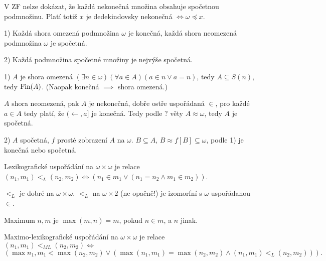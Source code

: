 \documentclass[12pt]{article}                   %
\begin{document}
    \begin{poznamka}
        V ZF nelze dokázat, že každá nekonečná množina obsahuje spočetnou podmnožinu. Platí totiž $x$ je dedekindovsky nekonečná $\Leftrightarrow \omega \preceq x$.
    \end{poznamka}

    \begin{veta}
        1) Každá shora omezená podmnožina $\omega$ je konečná, každá shora neomezená podmnožina $\omega$ je spočetná.

        2) Každá podmnožina spočetné množiny je nejvýše spočetná.

        \begin{dukazin}
            1) $A$ je shora omezená $(\exists n \in \omega)(\forall a \in A)(a \in n \lor a = n)$, tedy $A \subseteq S(n)$, tedy $\operatorname{Fin}(A)$. (Naopak konečná $\implies$ shora omezená.)

            $A$ shora neomezená, pak $A$ je nekonečná, dobře ostře uspořádaná $\in$, pro každé $a \in A$ tedy platí, že $(\leftarrow, a]$ je konečná. Tedy podle ? věty $A \approx \omega$, tedy $A$ je spočetná.

            2) $A$ spočetná, $f$ prosté zobrazení $A$ na $\omega$. $B \subseteq A$, $B \approx f[B] \subseteq \omega$, podle 1) je konečná nebo spočetná.
        \end{dukazin}
    \end{veta}


    \begin{definice}
        Lexikografické uspořádání na $\omega \times \omega$ je relace $(n_1, m_1) <_L (n_2, m_2) \Leftrightarrow (n_1 \in m_1 \lor (n_1=n_2 \land m_1 \in m_2))$.
    \end{definice}

    \begin{dusledek}
        $<_L$ je dobré na $\omega\times \omega$. $<_L$ na $\omega \times 2$ (ne opačně!) je izomorfní s $\omega$ uspořádanou $\in$.
    \end{dusledek}

    \begin{definice}[Maximum]
        Maximum $n, m$ je $\max(m, n) = m$, pokud $n \in m$, a $n$ jinak.
    \end{definice}

    \begin{definice}
        Maximo-lexikografické uspořádání na $\omega \times \omega$ je relace $(n_1, m_1) <_{ML} (n_2, m_2) \Leftrightarrow$
        $$ (\max{n_1, m_1} < \max(n_2, m_2) \lor (\max(n_1, m_1) = \max(n_2, m_2) \land (n_1, m_1) <_L (n_2, m_2))). $$
    \end{definice}
\end{document}
